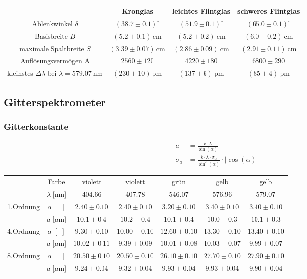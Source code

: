 \documentclass[12pt,a4paper,titlepage,headinclude,bibtotoc]{scrartcl}
\begin{document}
\begin{table}[!htb]
	\centering
	\begin{tabular}{|c|c|c|c|}
		\hline		
		& Kronglas & leichtes Flintglas & schweres Flintglas \\
		\hline
	    Ablenkwinkel $\delta$ & $(38.7\pm 0.1)^\circ$ &  $(51.9\pm 0.1)^\circ$ & $(65.0\pm 0.1)^\circ$ \\
	    Basisbreite $B$ & $(5.2 \pm 0.1)~$cm & $(5.2 \pm 0.2)~$cm &$(6.0 \pm 0.2)~$cm \\
	    maximale Spaltbreite $S$ & $(3.39 \pm 0.07)~$cm & $(2.86 \pm 0.09)~$cm & $(2.91 \pm 0.11)~$cm \\
	    Auflösungsvermögen A& $2560 \pm 120$ & $4220 \pm 180$ & $6800 \pm 290$ \\
		kleinstes $\Delta \lambda$ bei $\lambda=579.07~$nm& $(230 \pm 10)~$pm & $(137 \pm 6)~$pm& $(85 \pm 4)~$pm \\
		\hline
	\end{tabular}
\end{table}

\subsection{Gitterspektrometer}
\subsubsection{Gitterkonstante}
\begin{align}
	a&=\frac{k \cdot \lambda}{\sin{\left (\alpha \right )}}\\
	\sigma_{a}&=\frac{k \cdot \lambda \cdot \sigma_{\alpha}}{\sin^{2}{\left (\alpha \right )}} \cdot \left\lvert{\cos{\left (\alpha \right )}}\right\rvert
\end{align}


\begin{table}[!htb]
	\centering	
	\begin{tabular}{|c|c|c|c|c|c|c|}
		\hline
		&Farbe & violett & violett & grün & gelb & gelb \\
		& $\lambda$ [nm]& 404.66 & 407.78 & 546.07 & 576.96 & 579.07\\
		\hline
		1.Ordnung & $\alpha$ $[^\circ]$ & $2.40 \pm 0.10$ & $2.40 \pm 0.10$ & $3.20 \pm 0.10$ & $3.40 \pm 0.10$ & $3.40 \pm 0.10$ \\ 
		& $a$ [$\mu$m] & $10.1 \pm 0.4$ & $10.2 \pm 0.4$ & $10.1 \pm 0.4$ & $10.0 \pm 0.3$ & $10.1 \pm 0.3$\\
		\hline
		4.Ordnung & $\alpha$ $[^\circ]$  & $9.30 \pm 0.10$
& $10.00 \pm 0.10$ & $12.60 \pm 0.10$ & $13.30 \pm 0.10$ & $13.40 \pm 0.10$ \\
		& $a$ [$\mu$m] & $10.02 \pm 0.11$ & $9.39 \pm 0.09$ & $10.01 \pm 0.08$ & $10.03 \pm 0.07$ & $9.99 \pm 0.07$ \\
		\hline
		8.Ordnung & $\alpha$ $[^\circ]$ & $20.50 \pm 0.10$
& $20.50 \pm 0.10$ & $26.10 \pm 0.10$ & $27.70 \pm 0.10$ & $27.90 \pm 0.10$ \\
		& $a$ [$\mu$m] & $9.24 \pm 0.04$ & $9.32 \pm 0.04$ & $9.93 \pm 0.04$ & $9.93 \pm 0.04$ & $9.90 \pm 0.04$ \\
		\hline
	\end{tabular}
\end{table}
\end{document}
